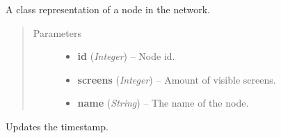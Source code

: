 \documentclass[letterpaper,10pt,english]{sphinxmanual}
\begin{document}
\begin{fulllineitems}
\label{swnp:swnp.Node}
A class representation of a node in the network.
\begin{quote}\begin{description}
\item[{Parameters}] \leavevmode\begin{itemize}
\item {} 
\textbf{id} (\emph{Integer}) -- Node id.

\item {} 
\textbf{screens} (\emph{Integer}) -- Amount of visible screens.

\item {} 
\textbf{name} (\emph{String}) -- The name of the node.

\end{itemize}

\end{description}\end{quote}

\begin{fulllineitems}
\label{swnp:swnp.Node.refresh}
Updates the timestamp.

\end{fulllineitems}


\end{fulllineitems}

\end{document}
